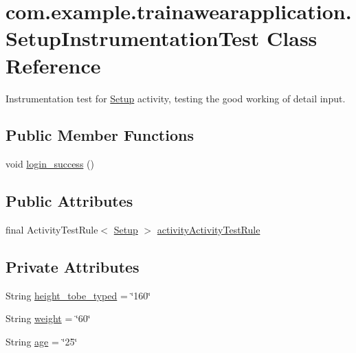 \hypertarget{classcom_1_1example_1_1trainawearapplication_1_1_setup_instrumentation_test}{}\section{com.\+example.\+trainawearapplication.\+Setup\+Instrumentation\+Test Class Reference}
\label{classcom_1_1example_1_1trainawearapplication_1_1_setup_instrumentation_test}


Instrumentation test for \mbox{\hyperlink{classcom_1_1example_1_1trainawearapplication_1_1_setup}{Setup}} activity, testing the good working of detail input.  


\subsection*{Public Member Functions}
\begin{DoxyCompactItemize}
\item 
void \mbox{\hyperlink{classcom_1_1example_1_1trainawearapplication_1_1_setup_instrumentation_test_a4dbc2cfc0d101616f6c60f075bc55d58}{login\+\_\+success}} ()
\end{DoxyCompactItemize}
\subsection*{Public Attributes}
\begin{DoxyCompactItemize}
\item 
final Activity\+Test\+Rule$<$ \mbox{\hyperlink{classcom_1_1example_1_1trainawearapplication_1_1_setup}{Setup}} $>$ \mbox{\hyperlink{classcom_1_1example_1_1trainawearapplication_1_1_setup_instrumentation_test_ac9f8d1c61d6707efca17625aa2c3ca28}{activity\+Activity\+Test\+Rule}}
\end{DoxyCompactItemize}
\subsection*{Private Attributes}
\begin{DoxyCompactItemize}
\item 
String \mbox{\hyperlink{classcom_1_1example_1_1trainawearapplication_1_1_setup_instrumentation_test_a969cc5898cf6bdc58207c1944f573a78}{height\+\_\+tobe\+\_\+typed}} = \char`\"{}160\char`\"{}
\item 
String \mbox{\hyperlink{classcom_1_1example_1_1trainawearapplication_1_1_setup_instrumentation_test_a09706ee1f2c90e4a5ea3edb460714adb}{weight}} = \char`\"{}60\char`\"{}
\item 
String \mbox{\hyperlink{classcom_1_1example_1_1trainawearapplication_1_1_setup_instrumentation_test_a8c73f8c3f826243e4d875a7e5a9898ff}{age}} = \char`\"{}25\char`\"{}
\end{DoxyCompactItemize}


